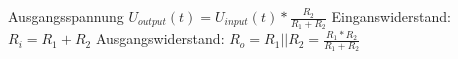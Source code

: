 \begin{frame}[c]{}

Ausgangsspannung
\begin{math}
  U_{output}(t) = U_{input}(t) * \frac{R_2}{R_1+R_2}
\end{math}
\newline
\newline
Einganswiderstand:
\begin{math}
  R_i = R_1+R_2
\end{math}
\newline
\newline
Ausgangswiderstand:
\begin{math}
  R_o = R_1 || R_2 = \frac{R_1 * R_2}{R_1+R_2}
\end{math}
\end{frame}
